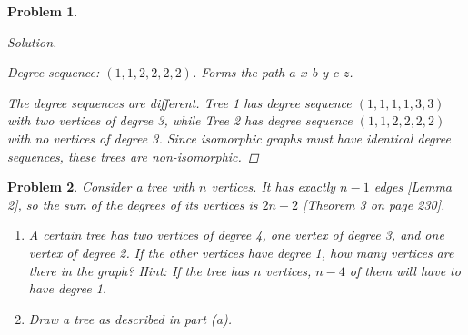 \documentclass[12pt]{article}
\newtheorem{problem}{Problem}
\begin{document}
\begin{problem}
\begin{proof}[Solution]
\begin{center}
\end{center}

Degree sequence: $(1,1,2,2,2,2)$. Forms the path $a$-$x$-$b$-$y$-$c$-$z$.

\vspace{0.3in}

The degree sequences are different. Tree 1 has degree sequence $(1,1,1,1,3,3)$ with two vertices of degree 3, while Tree 2 has degree sequence $(1,1,2,2,2,2)$ with no vertices of degree 3. Since isomorphic graphs must have identical degree sequences, these trees are non-isomorphic.

\end{proof}
\end{problem}

\setcounter{problem}{6}
\begin{problem}
Consider a tree with $n$ vertices. It has exactly $n - 1$ edges [Lemma 2], so the sum of the degrees of its vertices is $2n - 2$ [Theorem 3 on page 230].

\begin{enumerate}[label=(\alph*)]
    \item A certain tree has two vertices of degree 4, one vertex of degree 3, and one vertex of degree 2. If the other vertices have degree 1, how many vertices are there in the graph? Hint: If the tree has $n$ vertices, $n - 4$ of them will have to have degree 1.
    
    \item Draw a tree as described in part (a).
\end{enumerate}
\end{problem}
\end{document}
